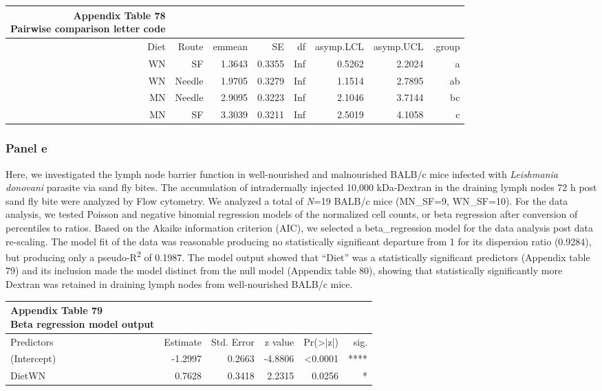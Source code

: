 \documentclass[
  12pt,
  letterpaper,
]{article}
\begin{document}
\begin{longtable}{rrrrrrrr}
\caption*{
{\large \textbf{Appendix Table 78}} \\ 
{\small \textbf{Pairwise comparison letter code}}
} \\ 
\toprule
Diet & Route & emmean & SE & df & asymp.LCL & asymp.UCL & .group \\ 
\midrule\addlinespace[2.5pt]
WN & SF & 1.3643 & 0.3355 & Inf & 0.5262 & 2.2024 &  a   \\ 
WN & Needle & 1.9705 & 0.3279 & Inf & 1.1514 & 2.7895 &  ab  \\ 
MN & Needle & 2.9095 & 0.3223 & Inf & 2.1046 & 3.7144 &   bc \\ 
MN & SF & 3.3039 & 0.3211 & Inf & 2.5019 & 4.1058 &    c \\ 
\bottomrule
\end{longtable}

\subsubsection{Panel e}\label{panel-e}

Here, we investigated the lymph node barrier function in well-nourished and malnourished BALB/c mice infected with \emph{Leishmania donovani} parasite via sand fly bites. The accumulation of intradermally injected 10,000 kDa-Dextran in the draining lymph nodes 72 h post sand fly bite were analyzed by Flow cytometry. We analyzed a total of \emph{N}=19 BALB/c mice (MN\_SF=9, WN\_SF=10). For the data analysis, we tested Poisson and negative binomial regression models of the normalized cell counts, or beta regression after conversion of percentiles to ratios. Based on the Akaike information criterion (AIC), we selected a beta\_regression model for the data analysis post data re-scaling. The model fit of the data was reasonable producing no statistically significant departure from 1 for its dispersion ratio (0.9284), but producing only a pseudo-R\textsuperscript{2} of 0.1987. The model output showed that ``Diet'' was a statistically significant predictors (Appendix table 79) and its inclusion made the model distinct from the null model (Appendix table 80), showing that statistically significantly more Dextran was retained in draining lymph nodes from well-nourished BALB/c mice.

\begin{longtable}{l|rrrrr}
\caption*{
{\large \textbf{Appendix Table 79}} \\ 
{\small \textbf{Beta regression model output}}
} \\ 
\toprule
\multicolumn{1}{l}{Predictors} & Estimate & Std. Error & z value & Pr(>|z|) & sig. \\ 
\midrule\addlinespace[2.5pt]
(Intercept) & -1.2997 & 0.2663 & -4.8806 & <0.0001 & **** \\ 
DietWN & 0.7628 & 0.3418 & 2.2315 & 0.0256 & * \\ 
\bottomrule
\end{longtable}
\end{document}
